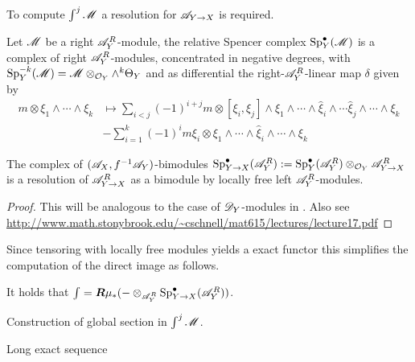     To compute $\int^j \mathscr{M}$ a resolution for $\mathscr{A}_{Y\to X}$ is required.
    \begin{definition}
        Let $\mathscr{M}$ be a right $\mathscr{A}_Y^R$-module, the relative Spencer complex $\operatorname{Sp}_Y^\bullet(\mathscr{M})$ is a complex of right $\mathscr{A}_Y^R$-modules, concentrated in negative degrees, with $\operatorname{Sp}_Y^{-k}(\mathscr{M}) = \mathscr{M} \otimes_{\mathcal{O}_Y} \wedge^{k}\Theta_Y$ and as differential the right-$\mathscr{A}_Y^R$-linear map $\delta$ given by
        \begin{align*}
            m\otimes \xi_1 \wedge \cdots \wedge \xi_k &\mapsto \sum_{i<j}(-1)^{i+j} m \otimes [\xi_i,\xi_j]\wedge \xi_1 \wedge \cdots \wedge \widehat{\xi}_i \wedge\cdots \widehat{\xi}_j \wedge \cdots \wedge \xi_k\\
            &- \sum_{i=1}^k (-1)^{i} m\xi_i \otimes \xi_1 \wedge \cdots \wedge \widehat{\xi}_i\wedge \cdots \wedge \xi_k
        \end{align*}
    \end{definition}
        \begin{lemma}
            The complex of $(\mathscr{A}_X,f^{-1}\mathscr{A}_Y)$-bimodules $\operatorname{Sp}^\bullet_{Y\to X}(\mathscr{A}_Y^R) := \operatorname{Sp}^\bullet_Y(\mathscr{A}_Y^R) \otimes_{\mathcal{O}_Y}\mathscr{A}_{Y \to X}^R$ is a resolution of $\mathscr{A}_{Y\to X}^R$ as a bimodule by locally free left $\mathscr{A}_Y^R$-modules.
        \end{lemma}
        \begin{proof}
            This will be analogous to the case of $\mathscr{D}_Y$-modules in \cite[p33]{sabbah2011introduction}.
            Also see \url{http://www.math.stonybrook.edu/~cschnell/mat615/lectures/lecture17.pdf}
        \end{proof}
        Since tensoring with locally free modules yields a exact functor this simplifies the computation of the direct image as follows.
        \begin{corollary}
            It holds that $\int = \boldsymbol{R}\mu_* ({-}\otimes_{\mathscr{A}_Y^R} \operatorname{Sp}_{Y\to X}^\bullet(\mathscr{A}_Y^R))$.
        \end{corollary}
        \begin{lemma}
            Construction of global section in $\int^j \mathscr{M}$.
        \end{lemma}
        \begin{theorem}
          Long exact sequence
        \end{theorem}
